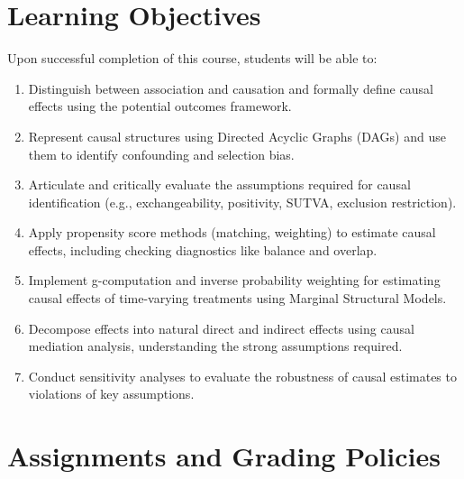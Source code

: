 \documentclass[11pt]{article}
\begin{document}
\vspace{6mm}
\section*{Learning Objectives}
Upon successful completion of this course, students will be able to:
\begin{enumerate}
  \item Distinguish between association and causation and formally define causal effects using the potential outcomes framework.
  \item Represent causal structures using Directed Acyclic Graphs (DAGs) and use them to identify confounding and selection bias.
  \item Articulate and critically evaluate the assumptions required for causal identification (e.g., exchangeability, positivity, SUTVA, exclusion restriction).
  \item Apply propensity score methods (matching, weighting) to estimate causal effects, including checking diagnostics like balance and overlap.
  \item Implement g-computation and inverse probability weighting for estimating causal effects of time-varying treatments using Marginal Structural Models.
  \item Decompose effects into natural direct and indirect effects using causal mediation analysis, understanding the strong assumptions required.
  \item Conduct sensitivity analyses to evaluate the robustness of causal estimates to violations of key assumptions.
\end{enumerate}

\vspace{6mm}
\section*{Assignments and Grading Policies}

\vspace{6mm}
\end{document}
